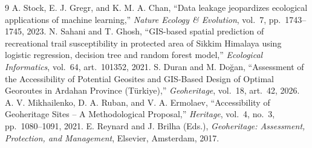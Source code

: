 \documentclass[11pt,a4paper]{article}
\begin{document}
\begin{thebibliography}{9}
 A. Stock, E. J. Gregr, and K. M. A. Chan, ``Data leakage jeopardizes ecological applications of machine learning,'' \emph{Nature Ecology \& Evolution}, vol.\ 7, pp.\ 1743--1745, 2023.
 N. Sahani and T. Ghosh, ``GIS-based spatial prediction of recreational trail susceptibility in protected area of Sikkim Himalaya using logistic regression, decision tree and random forest model,'' \emph{Ecological Informatics}, vol.\ 64, art.\ 101352, 2021.
 S. Duran and M. Doğan, ``Assessment of the Accessibility of Potential Geosites and GIS-Based Design of Optimal Georoutes in Ardahan Province (Türkiye),'' \emph{Geoheritage}, vol.\ 18, art.\ 42, 2026.
 A. V. Mikhailenko, D. A. Ruban, and V. A. Ermolaev, ``Accessibility of Geoheritage Sites -- A Methodological Proposal,'' \emph{Heritage}, vol.\ 4, no.\ 3, pp.\ 1080--1091, 2021.
 E. Reynard and J. Brilha (Eds.), \emph{Geoheritage: Assessment, Protection, and Management}, Elsevier, Amsterdam, 2017.
\end{thebibliography}
\end{document}
